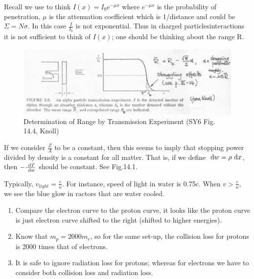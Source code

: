 \documentclass{school-22.101-notes}
\begin{document}
\begin{enumerate}
Recall we use to think $\displaystyle I(x) = I_0 e^{-\mu x}$ where $e^{-\mu x}$ is the probability of penetration, $\mu$ is the attenuation coefficient which is 1/distance and could be $\Sigma = N \sigma$. In this case $\frac{I}{I_0}$ is not exponential. Thus in charged particlesinteractions it is not sufficient to think of $I(x)$; one should be thinking about the range R. 
\begin{figure}[ht]
  \centering
  \includegraphics[width=5in]{images/ni/14.4.png}
  \caption{Determination of Range by Transmission Experiment (SY6 Fig. 14.4, Knoll)} \label{14.4}
\end{figure}
\end{enumerate}



If we consider $\frac{Z}{A}$ to be a constant, then this seems to imply that stopping power divided by density is a constant for all matter. That is, if we define $\mbox{ }\mathrm{d} w = \rho \mbox{ }\mathrm{d} x$, then $-\frac{\mbox{ }\mathrm{d} T}{\mbox{ }\mathrm{d} w}$ should be constant. See Fig.14.1. 





Typically, $v_{light} = \frac{c}{n}.$ For instance, speed of light in water is 0.75c. When $v> \frac{c}{n}$, we see the blue glow in ractors that are water cooled. 



\begin{enumerate}
\item Compare the electron curve to the proton curve, it looks like the proton curve is just electron curve shifted to the right (shifted to higher energies). 
\item Know that $m_p = 2000 m_e$, so for the same set-up, the collision loss for protons is 2000 times that of electrons. 
\item It is safe to ignore radiation loss for protons; whereas for electrons we have to consider both collision loss and radiation loss. 
\end{enumerate}
\end{document}
